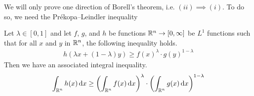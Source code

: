 \documentclass[11pt]{article}
\begin{document}
We will only prove one direction of Borell's theorem, i.e. $(ii) \implies (i)$.
To do so, we need the Prékopa–Leindler inequality
\begin{theorem}
  Let $\lambda \in [0,1]$ and let $f$, $g$, and $h$ be functions $\mathbb{R}^n \to [0, \infty]$ be $L^1$ functions such that for all $x$ and $y$ in $\mathbb{R}^n$, the following inequality holds.
  \begin{align*}
    h(\lambda x + (1-\lambda)y) \geq f(x)^{\lambda} \cdot g(y)^{1-\lambda}
  \end{align*}
  Then we have an associated integral inequality.
  \begin{align*}
    \int_{\mathbb{R}^n} h(x) \mathrm{\,d} x \geq \left( \int_{\mathbb{R}^n} f(x) \mathrm{\,d} x \right)^{\lambda} \cdot \left( \int_{\mathbb{R}^n} g(x) \mathrm{\,d} x \right)^{1 - \lambda}
  \end{align*}
\end{theorem}
\end{document}
